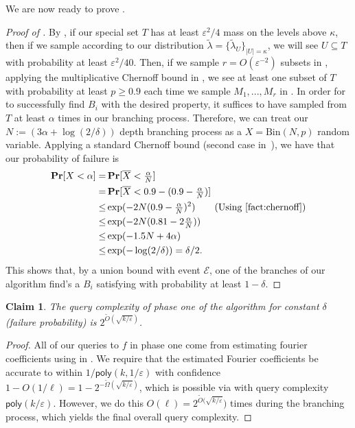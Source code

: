 \documentclass[10pt,a4paper]{article}
\providecommand{\poly}{\mathsf{poly}}
\theoremstyle{plain}
\newtheorem{claim}[theorem]{Claim}
\theoremstyle{remark}
\theoremstyle{plain}
\renewcommand{\Pr}{\mathop{\bf Pr\/}}
\newcommand{\eps}{\varepsilon}
\renewcommand{\tilde}{\widetilde}
\newcommand{\calE}{\mathcal{E}}
\newcommand{\specialset}{T}
\newcommand{\Binomial}{\textrm{Bin}}
\newcommand{\fourierCutoff}{\kappa}
\newcommand{\branchProcessDepth}{\alpha}
\renewcommand{\epsilon}{\varepsilon}
\begin{document}
We are now ready to prove .
\begin{proof}[Proof of ]
 By , if our special set $\specialset$ has at least $\epsilon^2/4$ mass on the levels above $\fourierCutoff$, then if we sample according to our distribution $\tilde{\lambda} = \{\tilde{\lambda}_U\}_{|U|=\fourierCutoff}$, we will see $U \subseteq \specialset$ with probability at least $\eps^2/40$. Then, if we sample $r = O(\eps^{-2})$ subsets in , applying the multiplicative Chernoff bound in , we see at least one subset of $\specialset$ with probability at least $p \geq 0.9$ each time we  sample $M_1,...,M_r$ in . In order for  to successfully find $B_i$ with the desired  property, it suffices to have sampled from $T$ at least $\branchProcessDepth$ times in our  branching process. Therefore, we can treat our $N:=(3\branchProcessDepth+\log(2/\delta))$  depth branching process as a $X = \Binomial(N, p)$ random variable.  Applying a  standard Chernoff bound (second case in~), we have that our probability of failure is 
 \begin{align*}
 \Pr[X < \branchProcessDepth] = & \Pr[\overline{X} < \tfrac{\branchProcessDepth}{N}] \\
 =& \Pr[\overline{X} < 0.9 - (0.9- \tfrac{\branchProcessDepth}{N})] \\
 \leq & \exp (-2N(0.9-\tfrac{\branchProcessDepth}{N})^2) \tag{Using \Cref{fact:chernoff}}\\
\leq &\exp (-2N(0.81-2\tfrac{\branchProcessDepth}{N} )) \\
 \leq & \exp(-1.5N + 4 \branchProcessDepth) \\
 \le & \exp(-\log(2/\delta)) = \delta/2.
 \end{align*}
  This shows that, by a union bound with event $\calE$, one of the branches of our algorithm find's a $B_i$ satisfying  with probability at least $1-\delta$.
\end{proof}

\begin{claim}
\label{claim:phase-one-query-complexity}
The query complexity of phase one of the algorithm for constant $\delta$ (failure probability) is $2^{\tilde{O}(\sqrt{k/\eps})}$.
\end{claim}

\begin{proof}
All of our queries to $f$ in phase one come from estimating fourier coefficients using  in . 
We require that the estimated Fourier coefficients be accurate to within $1/\poly(k,1/\eps)$ with confidence $1- O(1/\ell) = 1- 2^{-\tilde{\Omega}(\sqrt{k/\eps})}$, which is possible via  with query complexity $\poly(k/\eps)$. However, we do this $O(\ell) = 2^{\tilde{O}(\sqrt{k/\eps}})$ times during the branching process, which yields the final overall query complexity. 
\end{proof}
\end{document}
